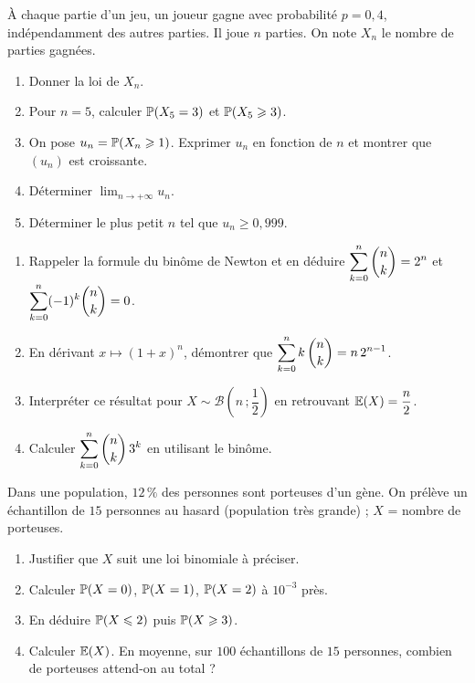 À chaque partie d'un jeu, un joueur gagne avec probabilité $p=0{,}4$,
indépendamment des autres parties. Il joue $n$ parties. On note $X_n$ le
nombre de parties gagnées.
\begin{enumerate}
	\item Donner la loi de $X_n$.
	\item Pour $n=5$, calculer $\mathbb{P}(X_5=3)$ et $\mathbb{P}(X_5\geqslant 3)$.
	\item On pose $u_n = \mathbb{P}(X_n\geqslant 1)$. Exprimer $u_n$ en fonction de
	$n$ et montrer que $(u_n)$ est croissante.
	\item Déterminer $\displaystyle\lim_{n\to+\infty}u_n$.
	\item Déterminer le plus petit $n$ tel que $u_n\geqslant 0{,}999$.
\end{enumerate}

\begin{enumerate}
	\item Rappeler la formule du binôme de Newton et en déduire
	$\displaystyle\sum_{k=0}^{n}\dbinom{n}{k}=2^n$ et
	$\displaystyle\sum_{k=0}^{n}(-1)^k\dbinom{n}{k}=0$.
	\item En dérivant $x\mapsto(1+x)^n$, démontrer que
	$\displaystyle\sum_{k=0}^{n}k\,\dbinom{n}{k}=n\,2^{n-1}$.
	\item Interpréter ce résultat pour $X\sim\mathscr{B}\!\left(n\,;\dfrac12\right)$
	en retrouvant $\mathbb{E}(X)=\dfrac n2$.
	\item Calculer $\displaystyle\sum_{k=0}^{n}\dbinom{n}{k}\,3^k$ en
	utilisant le binôme.
\end{enumerate}

Dans une population, $12\,\%$ des personnes sont porteuses d'un gène. On
prélève un échantillon de $15$ personnes au hasard (population très grande) ;
$X$ = nombre de porteuses.
\begin{enumerate}
	\item Justifier que $X$ suit une loi binomiale à préciser.
	\item Calculer $\mathbb{P}(X=0)$, $\mathbb{P}(X=1)$, $\mathbb{P}(X=2)$ à $10^{-3}$ près.
	\item En déduire $\mathbb{P}(X\leqslant 2)$ puis $\mathbb{P}(X\geqslant 3)$.
	\item Calculer $\mathbb{E}(X)$. En moyenne, sur $100$ échantillons de $15$
	personnes, combien de porteuses attend-on au total ?
\end{enumerate}
